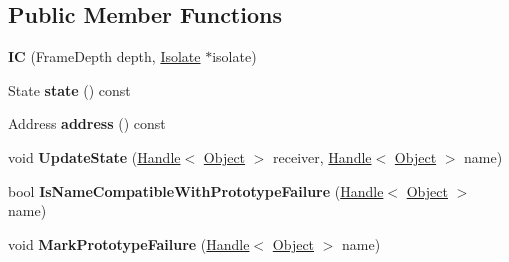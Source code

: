 \subsection*{Public Member Functions}
\begin{DoxyCompactItemize}
\item 
\hypertarget{classv8_1_1internal_1_1_i_c_a89351b6dec3bb075e5070304d22a57c6}{}{\bfseries I\+C} (Frame\+Depth depth, \hyperlink{classv8_1_1internal_1_1_isolate}{Isolate} $\ast$isolate)\label{classv8_1_1internal_1_1_i_c_a89351b6dec3bb075e5070304d22a57c6}

\item 
\hypertarget{classv8_1_1internal_1_1_i_c_a7b761ceb22ab59700627daa4dc867c81}{}State {\bfseries state} () const \label{classv8_1_1internal_1_1_i_c_a7b761ceb22ab59700627daa4dc867c81}

\item 
\hypertarget{classv8_1_1internal_1_1_i_c_ad585094a01239a3c781c159706c822ed}{}Address {\bfseries address} () const \label{classv8_1_1internal_1_1_i_c_ad585094a01239a3c781c159706c822ed}

\item 
\hypertarget{classv8_1_1internal_1_1_i_c_a50579cded027ba2f7e5396ca5e3ad400}{}void {\bfseries Update\+State} (\hyperlink{classv8_1_1internal_1_1_handle}{Handle}$<$ \hyperlink{classv8_1_1internal_1_1_object}{Object} $>$ receiver, \hyperlink{classv8_1_1internal_1_1_handle}{Handle}$<$ \hyperlink{classv8_1_1internal_1_1_object}{Object} $>$ name)\label{classv8_1_1internal_1_1_i_c_a50579cded027ba2f7e5396ca5e3ad400}

\item 
\hypertarget{classv8_1_1internal_1_1_i_c_a3e0ca64ced7bf1ee74d4dfe42732ccd8}{}bool {\bfseries Is\+Name\+Compatible\+With\+Prototype\+Failure} (\hyperlink{classv8_1_1internal_1_1_handle}{Handle}$<$ \hyperlink{classv8_1_1internal_1_1_object}{Object} $>$ name)\label{classv8_1_1internal_1_1_i_c_a3e0ca64ced7bf1ee74d4dfe42732ccd8}

\item 
\hypertarget{classv8_1_1internal_1_1_i_c_a76287d2cbfd9270839fd11aae38c4bc1}{}void {\bfseries Mark\+Prototype\+Failure} (\hyperlink{classv8_1_1internal_1_1_handle}{Handle}$<$ \hyperlink{classv8_1_1internal_1_1_object}{Object} $>$ name)\label{classv8_1_1internal_1_1_i_c_a76287d2cbfd9270839fd11aae38c4bc1}

\end{DoxyCompactItemize}
